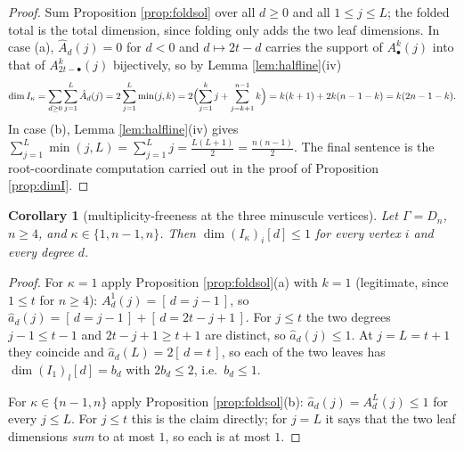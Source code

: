 \documentclass[reqno]{amsart}
\theoremstyle{plain}
\newtheorem{corollary}[theorem]{Corollary}
\theoremstyle{definition}
\newcommand{\ka}{\kappa}
\begin{document}
\begin{proof}
Sum Proposition \ref{prop:foldsol} over all $d\ge0$ and all $1\le j\le L$;
the folded total is the total dimension, since folding only adds the two
leaf dimensions.  In case (a), $\hat A_d(j)=0$ for $d<0$ and $d\mapsto2t-d$
carries the support of $A^{k}_{\bullet}(j)$ into that of
$A^{k}_{2t-\bullet}(j)$ bijectively, so by Lemma \ref{lem:halfline}(iv)
\[
   \dim I_\ka=\sum_{d\ge0}\sum_{j=1}^{L}\hat A_d(j)
   =2\sum_{j=1}^{L}\min(j,k)
   =2\Bigl(\sum_{j=1}^{k}j+\sum_{j=k+1}^{n-1}k\Bigr)
   =k(k+1)+2k(n-1-k)=k(2n-1-k).
\]
In case (b), Lemma \ref{lem:halfline}(iv) gives
$\sum_{j=1}^{L}\min(j,L)=\sum_{j=1}^{L}j=\tfrac{L(L+1)}{2}
=\tfrac{n(n-1)}{2}$.  The final sentence is the root-coordinate computation
carried out in the proof of Proposition \ref{prop:dimI}.
\end{proof}

\begin{corollary}[multiplicity-freeness at the three minuscule
vertices]\label{cor:mfree}
Let $\Gamma=D_n$, $n\ge4$, and $\ka\in\{1,n-1,n\}$.  Then
$\dim(I_\ka)_i[d]\le1$ for every vertex $i$ and every degree $d$.
\end{corollary}

\begin{proof}
For $\ka=1$ apply Proposition \ref{prop:foldsol}(a) with $k=1$ (legitimate,
since $1\le t$ for $n\ge4$): $A^{1}_d(j)=[\,d=j-1\,]$, so
$\hat a_d(j)=[\,d=j-1\,]+[\,d=2t-j+1\,]$.  For $j\le t$ the two degrees
$j-1\le t-1$ and $2t-j+1\ge t+1$ are distinct, so $\hat a_d(j)\le1$.  At
$j=L=t+1$ they coincide and $\hat a_d(L)=2[\,d=t\,]$, so each of the two
leaves has $\dim(I_1)_{l}[d]=b_d$ with $2b_d\le2$, i.e.\ $b_d\le1$.

For $\ka\in\{n-1,n\}$ apply Proposition \ref{prop:foldsol}(b):
$\hat a_d(j)=A^{L}_d(j)\le1$ for every $j\le L$.  For $j\le t$ this is the
claim directly; for $j=L$ it says that the two leaf dimensions \emph{sum} to
at most $1$, so each is at most $1$.
\end{proof}
\end{document}
